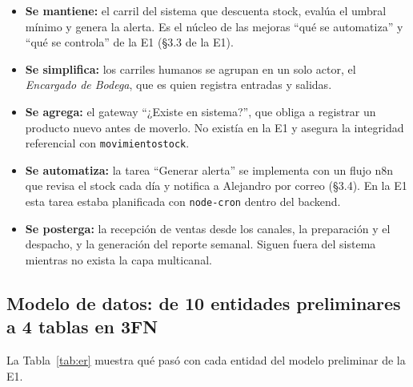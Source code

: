 \documentclass[11pt,letterpaper]{article}
\renewcommand{\_}{\oldus\allowbreak}
\begin{document}
\begin{itemize}
\item \textbf{Se mantiene:} el carril del sistema que descuenta stock, evalúa el umbral mínimo y genera la alerta. Es el núcleo de las mejoras “qué se automatiza” y “qué se controla” de la E1 (§3.3 de la E1).
\item \textbf{Se simplifica:} los carriles humanos se agrupan en un solo actor, el \emph{Encargado de Bodega}, que es quien registra entradas y salidas.
\item \textbf{Se agrega:} el gateway “¿Existe en sistema?”, que obliga a registrar un producto nuevo antes de moverlo. No existía en la E1 y asegura la integridad referencial con \texttt{movimiento\_stock}.
\item \textbf{Se automatiza:} la tarea “Generar alerta” se implementa con un flujo n8n que revisa el stock cada día y notifica a Alejandro por correo (§3.4). En la E1 esta tarea estaba planificada con \texttt{node-cron} dentro del backend.
\item \textbf{Se posterga:} la recepción de ventas desde los canales, la preparación y el despacho, y la generación del reporte semanal. Siguen fuera del sistema mientras no exista la capa multicanal.
\end{itemize}

\subsection{Modelo de datos: de 10 entidades preliminares a 4 tablas en 3FN}
La Tabla~\ref{tab:er} muestra qué pasó con cada entidad del modelo preliminar de la E1.
\end{document}
